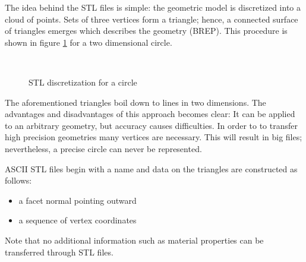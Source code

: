The idea behind the STL files is simple: the geometric model is discretized into a cloud of points. Sets of three vertices form a triangle; hence, a connected surface of triangles emerges which describes the geometry (BREP). This procedure is shown in figure \ref{fig:STL} for a two dimensional circle.  
\begin{figure}
\centering
   \\
   \caption{STL discretization for a circle}
   \label{fig:STL}
\end{figure}
The aforementioned triangles boil down to lines in two dimensions. The advantages and disadvantages of this approach becomes clear: It can be applied to an arbitrary geometry, but accuracy causes difficulties. In order to to transfer high precision geometries many vertices are necessary. This will result in big files; nevertheless, a precise circle can never be represented. 

ASCII STL files begin with a name and data on the triangles are constructed as follows: 
\begin{itemize}
\item a facet normal pointing outward
\item a sequence of vertex coordinates
\end{itemize}
Note that no additional information such as material properties can be transferred through STL files. 
